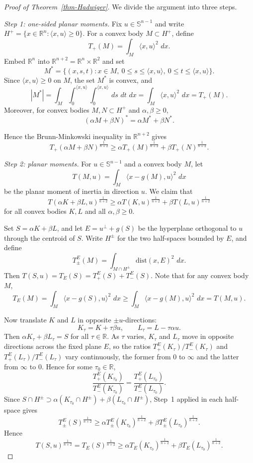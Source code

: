 \documentclass[12pt,leqno]{amsart}
\theoremstyle{plain} \newtheorem{thm}{Theorem}[section]
\theoremstyle{plain} \newtheorem{prop}[thm]{Proposition}
\theoremstyle{plain} \newtheorem{prob}[thm]{Problem}
\theoremstyle{definition} \newtheorem{defi}[thm]{Definition}
\theoremstyle{plain} \newtheorem{cor}[thm]{Corollary}
\theoremstyle{plain} \newtheorem{lem}[thm]{Lemma}
\theoremstyle{plain} \newtheorem{eg}{Example}[section]
\theoremstyle{remark} \newtheorem{rmk}[thm]{Remark}
\theoremstyle{plain} \newtheorem{conj}{Conjecture}
\numberwithin{equation}{section}
\newcommand{\bR}{\mathbb{R}}
\newcommand{\bS}{\mathbb{S}}
\newcommand{\dist}{\mathrm{dist}}
\newcommand{\dd}{\,d}
\newcommand{\R}{\mathbb{R}}
\begin{document}
\begin{proof}[Proof of Theorem~\ref{thm-Hadwiger}]
We divide the argument into three steps.

\smallskip
\noindent\emph{Step 1: one-sided planar moments.}
Fix $u\in \bS^{n-1}$ and write $H^+=\{x\in\bR^{n}:\langle x,u\rangle\ge0\}$. For a convex body $M\subset H^+$, define
\[
    T_+(M)=\int_M \langle x,u\rangle^2\,\dd x.
\]
Embed $\R^n$ into $\R^{n+2}=\R^n\times\R^2$ and set
\[
    M^*=\{(x,s,t):x\in M,\ 0\le s\le \langle x,u\rangle,\ 0\le t\le \langle x,u\rangle\}.
\]
Since $\langle x,u\rangle\ge0$ on $M$, the set $M^*$ is convex, and
\[
    |M^*|
    =\int_M\int_0^{\langle x,u\rangle}\int_0^{\langle x,u\rangle}\dd s\,\dd t\,\dd x
    =\int_M \langle x,u\rangle^2\,\dd x
    =T_+(M).
\]
Moreover, for convex bodies $M,N\subset H^+$ and $\alpha,\beta\ge0$,
\[
    (\alpha M+\beta N)^*=\alpha M^*+\beta N^*.
\]
 
Hence the Brunn-Minkowski inequality in $\R^{n+2}$ gives
\[
    T_+(\alpha M+\beta N)^{\frac1{n+2}}
    \ge \alpha T_+(M)^{\frac1{n+2}}+\beta T_+(N)^{\frac1{n+2}}.
\]

\smallskip
\noindent\emph{Step 2: planar moments.}
For $u\in \bS^{n-1}$ and a convex body $M$, let
\[
    T(M,u)=\int_M \langle x-g(M),u\rangle^2\,\dd x
\]
be the planar moment of inertia in direction $u$. We claim that
\begin{equation}\label{eq-planar-Hadwiger}
    T(\alpha K+\beta L,u)^{\frac1{n+2}}
    \ge \alpha T(K,u)^{\frac1{n+2}}+\beta T(L,u)^{\frac1{n+2}}
\end{equation}
for all convex bodies $K,L$ and all $\alpha,\beta\ge0$.

Set $S=\alpha K+\beta L$, and let $E=u^\perp+g(S)$ be the hyperplane orthogonal to $u$ through the centroid of $S$. Write $H^\pm$ for the two half-spaces bounded by $E$, and define
\[
    T_\pm^E(M)=\int_{M\cap H^\pm}\dist(x,E)^2\,\dd x.
\]
Then $T(S,u)=T_E(S)=T_+^E(S)+T_-^E(S)$. Note that for any convex body $M$,
\begin{equation}\label{TE-relation}
    T_E(M)=\int_{M}\langle x-g(S),u\rangle^2\,\dd x\geq \int_{M}\langle x-g(M),u\rangle^2\,\dd x=T(M,u).
\end{equation}

Now translate $K$ and $L$ in opposite $\pm u$-directions:
\[
    K_\tau=K+\tau\beta u,\qquad L_\tau=L-\tau\alpha u.
\]
Then $\alpha K_\tau+\beta L_\tau=S$ for all $\tau\in\R$.
As $\tau$ varies, $K_\tau$ and $L_\tau$ move in opposite directions across the fixed plane $E$, so the ratios $T_+^E(K_\tau)/T_-^E(K_\tau)$ and $T_+^E(L_\tau)/T_-^E(L_\tau)$ vary continuously, the former from $0$ to $\infty$ and the latter from $\infty$ to $0$. Hence for some $\tau_0\in\mathbb R$,
\[
\frac{T_+^E(K_{\tau_0})}{T_-^E(K_{\tau_0})}
=
\frac{T_+^E(L_{\tau_0})}{T_-^E(L_{\tau_0})}.
\]
Since $S\cap H^\pm \supset \alpha(K_{\tau_0}\cap H^\pm)+\beta(L_{\tau_0}\cap H^\pm)$,
Step~1 applied in each half-space gives
\[
    T_\pm^E(S)^{\frac1{n+2}}
    \ge \alpha T_\pm^E(K_{\tau_0})^{\frac1{n+2}}
      + \beta T_\pm^E(L_{\tau_0})^{\frac1{n+2}}.
\]
Hence
\[
 T(S,u)^{\frac1{n+2}}=T_E(S)^{\frac1{n+2}}
    \ge \alpha T_E(K_{\tau_0})^{\frac1{n+2}}
      + \beta T_E(L_{\tau_0})^{\frac1{n+2}}.
\]


\end{proof}
\end{document}
